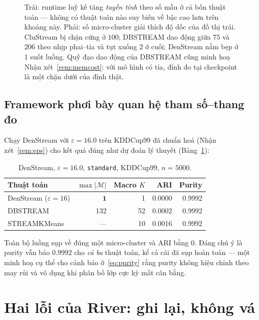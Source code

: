 \documentclass[11pt,a4paper]{article}
\theoremstyle{remark}
\begin{document}
\begin{figure}[htbp]
\caption{Trái: runtime luỹ kế tăng \emph{tuyến tính} theo số mẫu ở cả bốn thuật
toán --- không có thuật toán nào suy biến về bậc cao hơn trên khoảng này. Phải:
số micro-cluster giải thích độ dốc của đồ thị trái. CluStream bị chặn cứng ở
$100$; DBSTREAM dao động giữa $75$ và $206$ theo nhịp phai--tỉa và tụt xuống $2$
ở cuối; DenStream nằm bẹp ở $1$ suốt luồng. Quỹ đạo dao động của DBSTREAM cũng
minh hoạ Nhận xét~\ref{rem:memcost}: với mô hình có tỉa, đỉnh đo tại checkpoint
là một chặn dưới của đỉnh thật.}
\label{fig:scalability}
\end{figure}

\subsection{Framework phơi bày quan hệ tham số--thang đo}
\label{sec:eps}

Chạy DenStream với $\varepsilon = 16.0$ trên KDDCup99 đã chuẩn hoá
(Nhận xét~\ref{rem:eps}) cho kết quả đúng như dự đoán lý thuyết
(Bảng~\ref{tab:eps}):

\begin{table}[htbp]
\centering
\small
\caption{DenStream, $\varepsilon=16.0$, \texttt{standard}, KDDCup99, $n=5000$.}
\label{tab:eps}
\begin{tabular}{@{}lrrrr@{}}
\toprule
\textbf{Thuật toán} & $\max|\mathcal{M}|$ & \textbf{Macro} $K$ & \textbf{ARI} & \textbf{Purity} \\
\midrule
DenStream ($\varepsilon=16$) & $\mathbf{1}$ & 1 & $\mathbf{0.0000}$ & 0.9992 \\
DBSTREAM  & 132 & 52 & 0.0002 & 0.9992 \\
STREAMKMeans & --- & 10 & 0.0016 & 0.9992 \\
\bottomrule
\end{tabular}
\end{table}

Toàn bộ luồng sụp về đúng một micro-cluster và ARI bằng $0$. Đáng chú ý là
purity vẫn báo $0.9992$ cho \emph{cả ba} thuật toán, kể cả cái đã sụp hoàn toàn
--- một minh hoạ cụ thể cho cảnh báo ở~\eqref{eq:purity} rằng purity không hiệu
chỉnh theo may rủi và vô dụng khi phân bố lớp cực kỳ mất cân bằng.

\section{Hai lỗi của River: ghi lại, không vá}
\label{sec:riverbugs}
\end{document}
